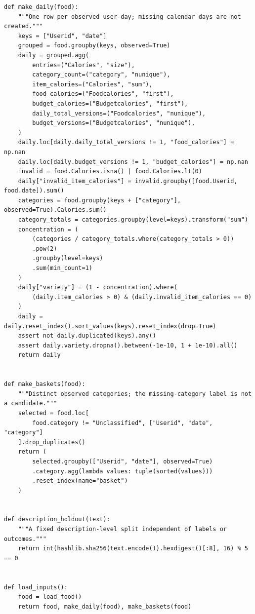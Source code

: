 \begin{Verbatim}[breaklines,breakanywhere,fontsize=\small]
def make_daily(food):
    """One row per observed user-day; missing calendar days are not created."""
    keys = ["Userid", "date"]
    grouped = food.groupby(keys, observed=True)
    daily = grouped.agg(
        entries=("Calories", "size"),
        category_count=("category", "nunique"),
        item_calories=("Calories", "sum"),
        food_calories=("Foodcalories", "first"),
        budget_calories=("Budgetcalories", "first"),
        daily_total_versions=("Foodcalories", "nunique"),
        budget_versions=("Budgetcalories", "nunique"),
    )
    daily.loc[daily.daily_total_versions != 1, "food_calories"] = np.nan
    daily.loc[daily.budget_versions != 1, "budget_calories"] = np.nan
    invalid = food.Calories.isna() | food.Calories.lt(0)
    daily["invalid_item_calories"] = invalid.groupby([food.Userid, food.date]).sum()
    categories = food.groupby(keys + ["category"], observed=True).Calories.sum()
    category_totals = categories.groupby(level=keys).transform("sum")
    concentration = (
        (categories / category_totals.where(category_totals > 0))
        .pow(2)
        .groupby(level=keys)
        .sum(min_count=1)
    )
    daily["variety"] = (1 - concentration).where(
        (daily.item_calories > 0) & (daily.invalid_item_calories == 0)
    )
    daily = daily.reset_index().sort_values(keys).reset_index(drop=True)
    assert not daily.duplicated(keys).any()
    assert daily.variety.dropna().between(-1e-10, 1 + 1e-10).all()
    return daily


def make_baskets(food):
    """Distinct observed categories; the missing-category label is not a candidate."""
    selected = food.loc[
        food.category != "Unclassified", ["Userid", "date", "category"]
    ].drop_duplicates()
    return (
        selected.groupby(["Userid", "date"], observed=True)
        .category.agg(lambda values: tuple(sorted(values)))
        .reset_index(name="basket")
    )


def description_holdout(text):
    """A fixed description-level split independent of labels or outcomes."""
    return int(hashlib.sha256(text.encode()).hexdigest()[:8], 16) % 5 == 0


def load_inputs():
    food = load_food()
    return food, make_daily(food), make_baskets(food)



\end{Verbatim}
